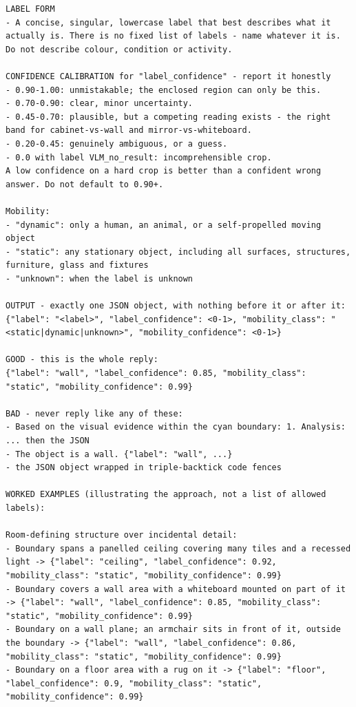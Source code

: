 \begin{lstlisting}[style=promptstyle]
LABEL FORM
- A concise, singular, lowercase label that best describes what it actually is. There is no fixed list of labels - name whatever it is. Do not describe colour, condition or activity.

CONFIDENCE CALIBRATION for "label_confidence" - report it honestly
- 0.90-1.00: unmistakable; the enclosed region can only be this.
- 0.70-0.90: clear, minor uncertainty.
- 0.45-0.70: plausible, but a competing reading exists - the right band for cabinet-vs-wall and mirror-vs-whiteboard.
- 0.20-0.45: genuinely ambiguous, or a guess.
- 0.0 with label VLM_no_result: incomprehensible crop.
A low confidence on a hard crop is better than a confident wrong answer. Do not default to 0.90+.

Mobility:
- "dynamic": only a human, an animal, or a self-propelled moving object
- "static": any stationary object, including all surfaces, structures, furniture, glass and fixtures
- "unknown": when the label is unknown

OUTPUT - exactly one JSON object, with nothing before it or after it:
{"label": "<label>", "label_confidence": <0-1>, "mobility_class": "<static|dynamic|unknown>", "mobility_confidence": <0-1>}

GOOD - this is the whole reply:
{"label": "wall", "label_confidence": 0.85, "mobility_class": "static", "mobility_confidence": 0.99}

BAD - never reply like any of these:
- Based on the visual evidence within the cyan boundary: 1. Analysis: ... then the JSON
- The object is a wall. {"label": "wall", ...}
- the JSON object wrapped in triple-backtick code fences

WORKED EXAMPLES (illustrating the approach, not a list of allowed labels):

Room-defining structure over incidental detail:
- Boundary spans a panelled ceiling covering many tiles and a recessed light -> {"label": "ceiling", "label_confidence": 0.92, "mobility_class": "static", "mobility_confidence": 0.99}
- Boundary covers a wall area with a whiteboard mounted on part of it -> {"label": "wall", "label_confidence": 0.85, "mobility_class": "static", "mobility_confidence": 0.99}
- Boundary on a wall plane; an armchair sits in front of it, outside the boundary -> {"label": "wall", "label_confidence": 0.86, "mobility_class": "static", "mobility_confidence": 0.99}
- Boundary on a floor area with a rug on it -> {"label": "floor", "label_confidence": 0.9, "mobility_class": "static", "mobility_confidence": 0.99}


\end{lstlisting}
